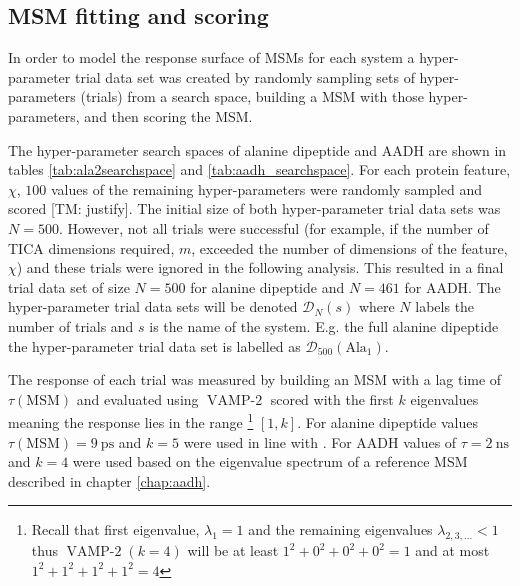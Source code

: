 \subsection{MSM fitting and scoring}\label{subsec:msm_fitting}
In order to  model the response surface of MSMs for each system a  hyper-parameter trial data set was created by randomly sampling sets of hyper-parameters (trials) from a search space, building a MSM with those hyper-parameters, and then scoring the MSM. 

The hyper-parameter search spaces of alanine dipeptide and AADH are shown in tables \ref{tab:ala2searchspace} and \ref{tab:aadh_searchspace}. For each protein feature, $\chi$, $100$ values of the remaining hyper-parameters were randomly sampled and scored [TM: justify]. The initial size of both hyper-parameter trial data sets was $N=500$. However, not all trials were successful (for example, if the number of TICA dimensions required, $m$, exceeded the number of dimensions of the feature, $\chi$) and these trials were ignored in the following analysis. This resulted in a final trial data set of size $N=500$ for alanine dipeptide and $N=461$ for AADH. The hyper-parameter trial data sets will be denoted $\mathcal{D}_{N}(s)$ where $N$ labels the number of trials and $s$ is the name of the system. E.g. the full alanine dipeptide the hyper-parameter trial data set is labelled as $\mathcal{D}_{500}(\mathrm{Ala}_{1})$. 

The response of each trial was measured by building an MSM with a lag time of $\tau(\mathrm{MSM})$ and evaluated using $\operatorname{VAMP-2}$ scored with the first $k$ eigenvalues meaning the response lies in the range \footnote{Recall that first eigenvalue, $\lambda_{1}=1$ and the remaining eigenvalues  $\lambda_{2,3,...} < 1$ thus $\operatorname{VAMP-2}(k=4)$ will be at least $1^2 + 0^2 + 0^2 + 0^2=1$ and at most $1^2 + 1^2 + 1^2 + 1^2=4$} $[1, k]$. For alanine dipeptide values $\tau(\mathrm{MSM})=\SI{9}{\pico\second}$ and $k=5$ were used in line with \cite{bowmanQuantitativeComparisonAlternative2013}.  For AADH values of $\tau=\SI{2}{\nano\second}$ and $k=4$ were used based on the eigenvalue spectrum of a reference MSM described in chapter \ref{chap:aadh}. 


